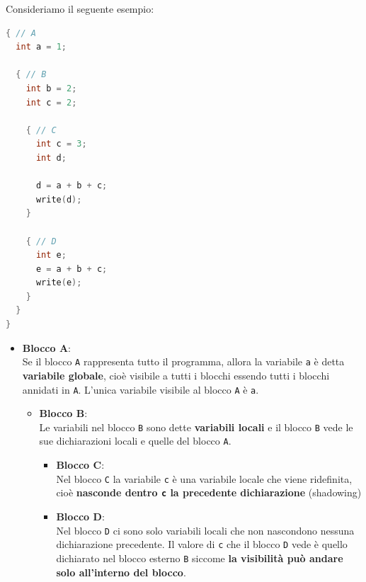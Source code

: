 \documentclass[a4paper]{article}
\begin{document}
\begin{example}
  Consideriamo il seguente esempio:
\begin{lstlisting}[language=C]
{ // A
  int a = 1;

  { // B
    int b = 2;
    int c = 2;

    { // C
      int c = 3;
      int d;

      d = a + b + c;
      write(d);
    }

    { // D
      int e;
      e = a + b + c;
      write(e);
    }
  }
}
\end{lstlisting}
  \begin{itemize}
    \item \textbf{Blocco A}:\\
      Se il blocco \texttt{A} rappresenta tutto il programma, allora la variabile
      \texttt{a} è detta \textbf{variabile globale}, cioè visibile a tutti i blocchi
      essendo tutti i blocchi annidati in \texttt{A}. L'unica variabile visibile
      al blocco \texttt{A} è \texttt{a}.

      \begin{itemize}
        \item \textbf{Blocco B}:\\
          Le variabili nel blocco \texttt{B} sono dette
          \textbf{variabili locali} e il blocco \texttt{B} vede le sue dichiarazioni
          locali e quelle del blocco \texttt{A}.

          \begin{itemize}
            \item \textbf{Blocco C}:\\
              Nel blocco \texttt{C} la variabile \texttt{c} è una variabile
              locale che viene ridefinita, cioè \textbf{nasconde dentro \texttt{c}
              la precedente dichiarazione} (shadowing)

            \item \textbf{Blocco D}:\\
              Nel blocco \texttt{D} ci sono solo variabili locali che non
              nascondono nessuna dichiarazione precedente. Il valore di \texttt{c}
              che il blocco \texttt{D} vede è quello dichiarato nel blocco
              esterno \texttt{B} siccome \textbf{la visibilità può andare solo
              all'interno del blocco}.
          \end{itemize}
      \end{itemize}
  \end{itemize}
\end{example}
\end{document}
